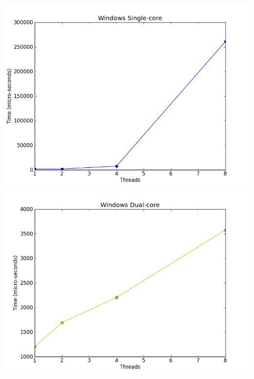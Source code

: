 \documentclass[12pt]{article}
\begin{document}
\includegraphics[scale=0.5]{output/win_singlecore_graph.png}
\includegraphics[scale=0.5]{output/win_multicore_graph.png}
\end{document}
